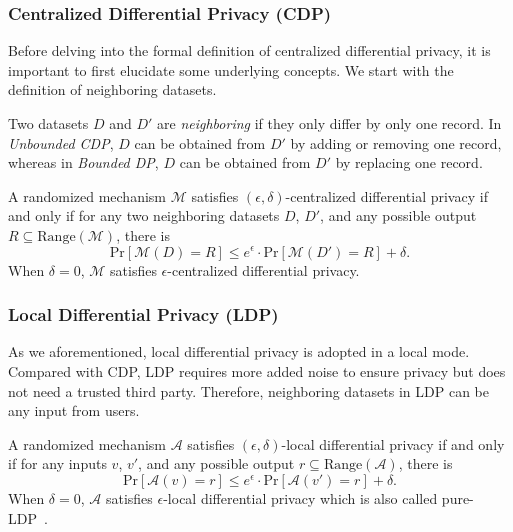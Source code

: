 \subsubsection{Centralized Differential Privacy (CDP)}
Before delving into the formal definition of centralized differential privacy, it is important to first elucidate some underlying concepts. We start with the definition of  neighboring datasets.
\begin{definition}
	Two datasets $D$ and $D'$ are \textit{neighboring} if they only differ by only one record. In \textit{Unbounded CDP}, $D$ can be obtained from $D'$ by adding or removing one record, whereas in \textit{Bounded DP}, $D$ can be obtained from $D'$ by replacing one record.
\end{definition}

\begin{definition} A randomized mechanism $\mathcal{M}$ satisfies $(\epsilon, \delta)$-centralized differential privacy if and only if for any two neighboring datasets $D$, $D'$, and any possible output $R\subseteq\mathrm{Range}(\mathcal{M})$, there is
	\begin{equation}
		\mathrm{Pr}[\mathcal{M}(D)=R]\le e^\epsilon\cdot \mathrm{Pr}[\mathcal{M}(D')=R]+\delta.\nonumber
	\end{equation}
When $\delta=0$, $\mathcal{M}$ satisfies $\epsilon$-centralized differential privacy.
\end{definition}



\subsubsection{Local Differential Privacy (LDP)}
As we aforementioned, local differential privacy is adopted in a local mode. Compared with CDP, LDP requires more added noise to ensure privacy but does not need a trusted third party. Therefore, neighboring datasets in LDP can be any input from users.
\begin{definition}
A randomized mechanism $\mathcal{A}$ satisfies $(\epsilon, \delta)$-local differential privacy if and only if for any inputs $v$, $v'$, and any possible output $r\subseteq\mathrm{Range}(\mathcal{A})$, there is
\begin{equation}
	\mathrm{Pr}[\mathcal{A}(v)=r]\le e^\epsilon\cdot \mathrm{Pr}[\mathcal{A}(v')=r]+\delta.\nonumber
\end{equation}
When $\delta=0$, $\mathcal{A}$ satisfies $\epsilon$-local differential privacy which is also called pure-LDP~\cite{wang2017locally}.
\end{definition}

